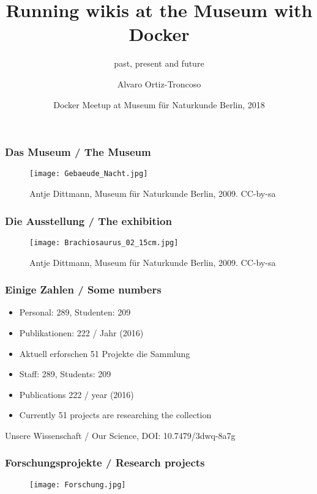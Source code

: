 \documentclass[13pt]{beamer}
\title
{Running wikis at the Museum with Docker}
\subtitle{past, present and future}
\author
{Alvaro Ortiz-Troncoso}
\date
{Docker Meetup at Museum für Naturkunde Berlin, 2018}
\begin{document}
{
  \frame{\titlepage}
}

\begin{frame}
  \frametitle{Das Museum / \textcolor{mfn_green}{The Museum}}
  \begin{figure}
    \texttt{[image: Gebaeude\_Nacht.jpg]}
    \caption{\textcopyright Antje Dittmann, Museum für Naturkunde Berlin, 2009. CC-by-sa}
  \end{figure}
\end{frame}

\begin{frame}
  \frametitle{Die Ausstellung / \textcolor{mfn_green}{The exhibition}}
  \begin{figure}
  \texttt{[image: Brachiosaurus\_02\_15cm.jpg]}
  \caption{\textcopyright Antje Dittmann, Museum für Naturkunde Berlin, 2009. CC-by-sa}
  \end{figure}
\end{frame}

\begin{frame}
  \frametitle{ Einige Zahlen / \textcolor{mfn_green}{Some numbers}}

  \begin{itemize}
  \item{Personal: 289, Studenten: 209}
  \item{Publikationen: 222 / Jahr (2016)}
  \item{Aktuell erforschen 51 Projekte die Sammlung}
  \end{itemize}
  
  \begin{itemize}
  \item{\textcolor{mfn_green}{Staff: 289, Students: 209}}
  \item{\textcolor{mfn_green}{Publications 222 / year (2016)}}
  \item{\textcolor{mfn_green}{Currently 51 projects are researching the collection}}
  \end{itemize}
  \bigskip
  \tiny{Unsere Wissenschaft / Our Science, DOI: 10.7479/3dwq-8a7g}
\end{frame}


\begin{frame}
  \frametitle{Forschungsprojekte / \textcolor{mfn_green}{Research projects}}
  \begin{figure}
  \texttt{[image: Forschung.jpg]}
  \end{figure}
\end{frame}
\end{document}

